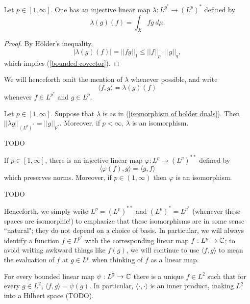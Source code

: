 \begin{lemma}
Let $p \in [1, \infty]$.
One has an injective linear map $\lambda: L^{p^*} \to (L^p)^*$ defined by
\begin{equation}
\label{isomorphism of holder duals}
\lambda(g)(f) = \int_X f\overline g ~d\mu.
\end{equation}
\end{lemma}
\begin{proof}
By H\"older's inequality,
\[|\lambda(g)(f)| = ||fg||_1 \leq ||f||_p \cdot ||g||_q,\]
which implies (\ref{bounded covector}).
\end{proof}

We will henceforth omit the mention of $\lambda$ whenever possible, and write
\[\langle f, g\rangle = \lambda(g)(f)\]
whenever $f \in L^{p^*}$ and $g \in L^p$.

\begin{theorem}
Let $p \in [1, \infty]$.
Suppose that $\lambda$ is as in (\ref{isomorphism of holder duals}).
Then $||\lambda g||_{(L^p)^*} = ||g||_{p^*}$.
Moreover, if $p < \infty$, $\lambda$ is an isomorphism.
\end{theorem}
TODO

\begin{corollary}
If $p \in [1, \infty]$, there is an injective linear map $\varphi: L^p \to (L^p)^{**}$ defined by
\[\langle \varphi(f), g\rangle = \langle g, f\rangle\]
which preserves norms. Moreover, if $p \in (1, \infty)$ then $\varphi$ is an isomorphism.
\end{corollary}
TODO

Henceforth, we simply write $L^p = (L^p)^{**}$ and $(L^p)^* = L^{p^*}$ (whenever these spaces are isomorphic!) to emphasize that these isomorphisms are in some sense ``natural"; they do not depend on a choice of basis.
In particular, we will always identify a function $f \in L^{p^*}$ with the corresponding linear map $f: L^p \to \mathbb{C}$; to avoid writing awkward things like $f(g)$, we will continue to use $\langle f, g\rangle$ to mean the evaluation of $f$ at $g \in L^p$ when thinking of $f$ as a linear map.

\begin{corollary}
For every bounded linear map $\psi: L^2 \to \mathbb{C}$ there is a unique $f \in L^2$ such that for every $g \in L^2$, $\langle f, g\rangle = \psi(g)$.
In particular, $\langle \cdot, \cdot \rangle$ is an inner product, making $L^2$ into a Hilbert space (TODO).
\end{corollary}

